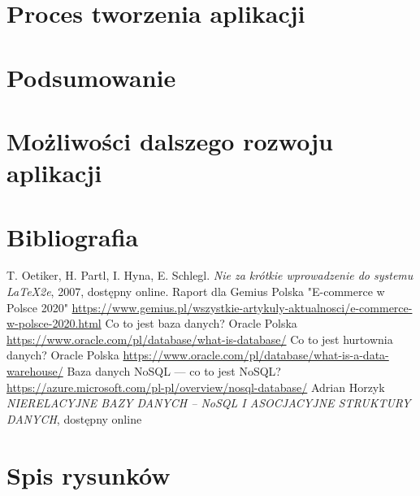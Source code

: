 \documentclass[12pt]{article}
\begin{document}
\begin{sloppypar}
{{}
}

\section{Proces tworzenia aplikacji}
{

}

\section{Podsumowanie}
{

}

\section{Możliwości dalszego rozwoju aplikacji}
{

}

\section{Bibliografia}
{
  \begin{thebibliography}{0}
     T. Oetiker, H. Partl, I. Hyna, E. Schlegl.
      \textsl{Nie za krótkie wprowadzenie do systemu \LaTeX2e}, 2007, dostępny
      online.
     Raport dla Gemius Polska "E-commerce w Polsce 2020"
      \url{https://www.gemius.pl/wszystkie-artykuly-aktualnosci/e-commerce-w-polsce-2020.html}
     Co to jest baza danych? Oracle Polska
      \url{https://www.oracle.com/pl/database/what-is-database/}
     Co to jest hurtownia danych? Oracle Polska
     \url{https://www.oracle.com/pl/database/what-is-a-data-warehouse/}
     Baza danych NoSQL — co to jest NoSQL?
      \url{https://azure.microsoft.com/pl-pl/overview/nosql-database/}
     Adrian Horzyk
      \textsl{NIERELACYJNE BAZY DANYCH – NoSQL I ASOCJACYJNE STRUKTURY DANYCH}, dostępny online

  \end{thebibliography}
}

\section{Spis rysunków}
{

}

\end{sloppypar}
\end{document}
